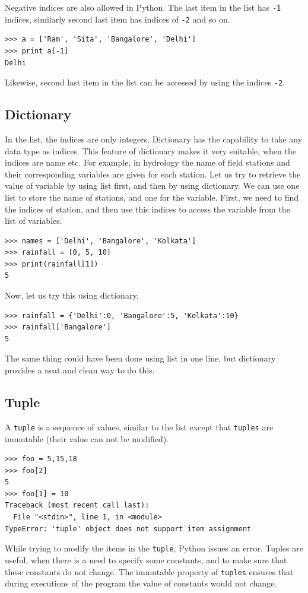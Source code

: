 \documentclass[10pt]{book}
\begin{document}
{
Negative indices are also allowed in Python. The last item in the list has \verb"-1" indices, similarly second last item has indices of \verb"-2" and so on.
\beforeverb
\begin{verbatim}
>>> a = ['Ram', 'Sita', 'Bangalore', 'Delhi']
>>> print a[-1]
Delhi
\end{verbatim}
\afterverb
Likewise, second last item in the list can be accessed by using the indices \verb"-2".

\subsection{Dictionary}
In the list, the indices are only integers. Dictionary has the capability to take any data type as indices. This feature of dictionary makes it very suitable, when the indices are name etc. For example, in hydrology the name of field stations and their corresponding variables are given for each station. Let us try to retrieve the value of variable by using list first, and then by using dictionary. We can use one list to store the name of stations, and one for the variable. First, we need to find the indices of station, and then use this indices to access the variable from the list of variables. 
\beforeverb \begin{verbatim}
>>> names = ['Delhi', 'Bangalore', 'Kolkata']
>>> rainfall = [0, 5, 10]
>>> print(rainfall[1])
5
\end{verbatim} \afterverb

Now, let us try this using dictionary. 
\beforeverb \begin{verbatim}
>>> rainfall = {'Delhi':0, 'Bangalore':5, 'Kolkata':10}
>>> rainfall['Bangalore']
5
\end{verbatim} \afterverb
The same thing could have been done using list in one line, but dictionary provides a neat and clean way to do this. 

\subsection{Tuple}
A \verb"tuple" is a sequence of values, similar to the list except that \verb"tuples" are immutable (their value can not be modified).
\beforeverb \begin{verbatim}
>>> foo = 5,15,18
>>> foo[2]
5
>>> foo[1] = 10
Traceback (most recent call last):
  File "<stdin>", line 1, in <module>
TypeError: 'tuple' object does not support item assignment
\end{verbatim} \afterverb
While trying to modify the items in the \verb"tuple", Python issues an error. Tuples are useful, when there is a need to specify some constants, and to make sure that these constants do not change. The immutable property of \verb"tuples" ensures that during executions of the program the value of constants would not change. 

}
\end{document}
